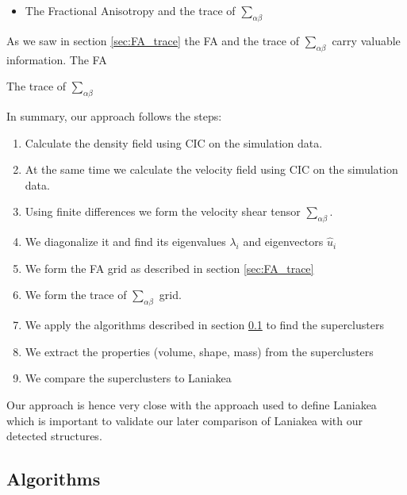 \documentclass[12pt]{article}
\begin{document}
\begin{itemize}
\item The Fractional Anisotropy and the trace of $\sum_{\alpha \beta}$
\end{itemize}
\begin{par}
As we saw in section \ref{sec:FA_trace} the FA and the trace of $\sum_{\alpha \beta}$ carry valuable information.
The FA %

The trace of $\sum_{\alpha \beta}$\\  %
\end{par}


\begin{par}
In summary, our approach follows the steps:
\end{par}

\begin{enumerate}
\item Calculate the density field using CIC on the simulation data.
\item At the same time we calculate the velocity field using CIC on the simulation data.
\item Using finite differences we form the velocity shear tensor $\sum_{\alpha \beta}$.
\item We diagonalize it and find its eigenvalues $\lambda_i$ and eigenvectors $\hat{u}_i$
\item We form the FA grid as described in section \ref{sec:FA_trace} 
\item We form the trace of $\sum_{\alpha \beta}$ grid.
\item We apply the algorithms described in section \ref{sec:algorithms} to find the superclusters
\item We extract the properties (volume, shape, mass) from the superclusters
\item We compare the superclusters to Laniakea
\end{enumerate}




\begin{par}
Our approach is hence very close with the approach
 used to define Laniakea
  \cite{tully_laniakea_2014} which is important to
   validate our later comparison of Laniakea with
    our detected structures.
\end{par}

\subsection{Algorithms}\label{sec:algorithms}
\end{document}
